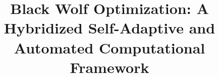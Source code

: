 \documentclass[conference]{IEEEtran}
\theoremstyle{definition}
\begin{document}
\title{Black Wolf Optimization: A Hybridized Self-Adaptive and Automated Computational Framework\\
}


% 

\maketitle
\end{document}
